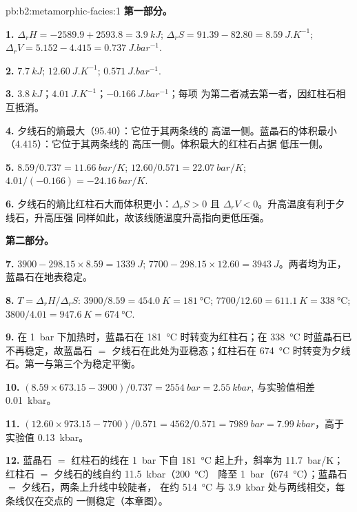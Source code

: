 \begin{solution}{pb:b2:metamorphic-facies:1}
\noindent\textbf{第一部分。}

\textbf{1.} $\Delta_r H = -2589.9 + 2593.8 = \qty{3.9}{kJ}$; $\Delta_r S = 91.39 - 82.80 =
\qty{8.59}{J.K^{-1}}$; $\Delta_r V = 5.152 - 4.415 = \qty{0.737}{J.bar^{-1}}$.

\textbf{2.} $\qty{7.7}{kJ}$; $\qty{12.60}{J.K^{-1}}$; $\qty{0.571}{J.bar^{-1}}$.

\textbf{3.} $\qty{3.8}{kJ}$；$\qty{4.01}{J.K^{-1}}$；$\qty{-0.166}{J.bar^{-1}}$；每项
为第二者减去第一者，因红柱石相互抵消。

\textbf{4.} 夕线石的熵最大（95.40）：它位于其两条线的
高温一侧。蓝晶石的体积最小（4.415）：它位于其两条线的
高压一侧。体积最大的红柱石占据
低压一侧。

\textbf{5.} $8.59/0.737 = \qty{11.66}{bar/K}$; $12.60/0.571 = \qty{22.07}{bar/K}$;
$4.01/(-0.166) = \qty{-24.16}{bar/K}$.

\textbf{6.} 夕线石的熵比红柱石大而体积更小：$\Delta_r S > 0$
且 $\Delta_r V < 0$。升高温度有利于夕线石，升高压强
同样如此，故该线随温度升高指向更低压强。

\noindent\textbf{第二部分。}

\textbf{7.} $3900 - 298.15\times8.59 = \qty{+1339}{J}$; $7700 - 298.15\times12.60 =
\qty{+3943}{J}$。两者均为正，蓝晶石在地表稳定。

\textbf{8.} $T = \Delta_r H/\Delta_r S$: $3900/8.59 = \qty{454.0}{K} = \qty{181}{\celsius}$;
$7700/12.60 = \qty{611.1}{K} = \qty{338}{\celsius}$; $3800/4.01 = \qty{947.6}{K} =
\qty{674}{\celsius}$.

\textbf{9.} 在 \qty{1}{bar} 下加热时，蓝晶石在
\qty{181}{\celsius} 时转变为红柱石；在 \qty{338}{\celsius} 时蓝晶石已不再稳定，故蓝晶石 $=$
夕线石在此处为亚稳态；红柱石在
\qty{674}{\celsius} 时转变为夕线石。第一与第三个为稳定平衡。

\textbf{10.} $(8.59\times673.15 - 3900)/0.737 = \qty{2554}{bar} = \qty{2.55}{kbar}$,
与实验值相差 \qty{0.01}{kbar}。

\textbf{11.} $(12.60\times973.15 - 7700)/0.571 = 4562/0.571 = \qty{7989}{bar} =
\qty{7.99}{kbar}$，高于实验值 \qty{0.13}{kbar}。

\textbf{12.} 蓝晶石 $=$ 红柱石的线在 \qty{1}{bar} 下自 \qty{181}{\celsius} 起上升，斜率为
\qty{11.7}{bar/K}；红柱石 $=$ 夕线石的线自约 \qty{11.5}{kbar}（\qty{200}{\celsius}）
降至 \qty{1}{bar}（\qty{674}{\celsius}）；蓝晶石 $=$ 夕线石，两条上升线中较陡者，
在约 \qty{514}{\celsius} 与 \qty{3.9}{kbar} 处与两线相交，每条线仅在交点的
一侧稳定（本章图）。


\end{solution}
